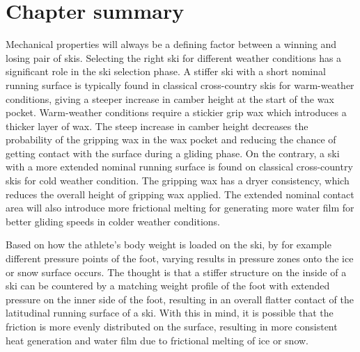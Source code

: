 \section{Chapter summary}
\label{sec:backgroundconclusion}
Mechanical properties will always be a defining factor between a winning and losing pair of skis. Selecting the right ski for different weather conditions has a significant role in the ski selection phase. A stiffer ski with a short nominal running surface is typically found in classical cross-country skis for warm-weather conditions, giving a steeper increase in camber height at the start of the wax pocket. Warm-weather conditions require a stickier grip wax which introduces a thicker layer of wax. The steep increase in camber height decreases the probability of the gripping wax in the wax pocket and reducing the chance of getting contact with the surface during a gliding phase.
On the contrary, a ski with a more extended nominal running surface is found on classical cross-country skis for cold weather condition. The gripping wax has a dryer consistency, which reduces the overall height of gripping wax applied. The extended nominal contact area will also introduce more frictional melting for generating more water film for better gliding speeds in colder weather conditions.

Based on how the athlete's body weight is loaded on the ski, by for example different pressure points of the foot, varying results in pressure zones onto the ice or snow surface occurs. The thought is that a stiffer structure on the inside of a ski can be countered by a matching weight profile of the foot with extended pressure on the inner side of the foot, resulting in an overall flatter contact of the latitudinal running surface of a ski. With this in mind, it is possible that the friction is more evenly distributed on the surface, resulting in more consistent heat generation and water film due to frictional melting of ice or snow.

